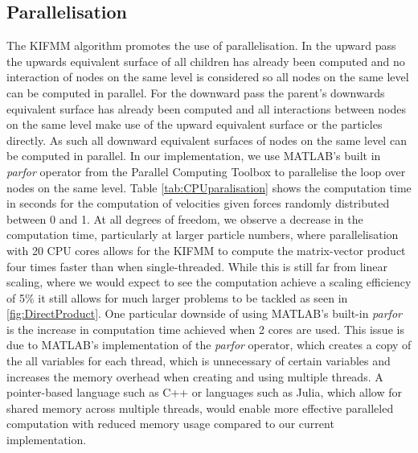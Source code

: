 \subsection{Parallelisation}
The KIFMM algorithm promotes the use of parallelisation. In the upward pass the upwards equivalent surface of all children has already been computed and no interaction of nodes on the same level is considered so all nodes on the same level can be computed in parallel. For the downward pass the parent's downwards equivalent surface has already been computed and all interactions between nodes on the same level make use of the upward equivalent surface or the particles directly. As such all downward equivalent surfaces of nodes on the same level can be computed in parallel. In our implementation, we use MATLAB's built in \textit{parfor} operator from the Parallel Computing Toolbox to parallelise the loop over nodes on the same level. Table \ref{tab:CPUparalisation} shows the computation time in seconds for the computation of velocities given forces randomly distributed between 0 and 1. At all degrees of freedom, we observe a decrease in the computation time, particularly at larger particle numbers, where parallelisation with 20 CPU cores allows for the KIFMM to compute the matrix-vector product four times faster than when single-threaded. While this is still far from linear scaling, where we would expect to see the computation achieve a scaling efficiency of 5\% it still allows for much larger problems to be tackled as seen in \cref{fig:DirectProduct}. One particular downside of using MATLAB's built-in \textit{parfor} is the increase in computation time achieved when 2 cores are used. This issue is due to MATLAB's implementation of the \textit{parfor} operator, which creates a copy of the all variables for each thread, which is unnecessary of certain variables and increases the memory overhead when creating and using multiple threads. A pointer-based language such as C++ or languages such as Julia, which allow for shared memory across multiple threads, would enable more effective paralleled computation with reduced memory usage compared to our current implementation.

